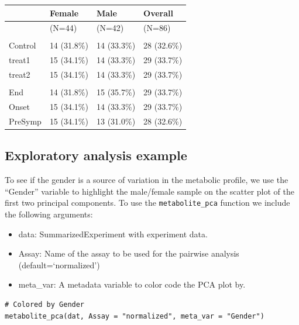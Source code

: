\begin{tabular}[t]{llll}
\toprule
  & Female & Male & Overall\\
\midrule
 & (N=44) & (N=42) & (N=86)\\
\addlinespace[0.3em]
\multicolumn{4}{l}{\textbf{GROUP\_NAME}}\\
\hspace{1em}Control & 14 (31.8\%) & 14 (33.3\%) & 28 (32.6\%)\\
\hspace{1em}treat1 & 15 (34.1\%) & 14 (33.3\%) & 29 (33.7\%)\\
\hspace{1em}treat2 & 15 (34.1\%) & 14 (33.3\%) & 29 (33.7\%)\\
\addlinespace[0.3em]
\multicolumn{4}{l}{\textbf{TIME1}}\\
\hspace{1em}End & 14 (31.8\%) & 15 (35.7\%) & 29 (33.7\%)\\
\hspace{1em}Onset & 15 (34.1\%) & 14 (33.3\%) & 29 (33.7\%)\\
\hspace{1em}PreSymp & 15 (34.1\%) & 13 (31.0\%) & 28 (32.6\%)\\
\bottomrule
\end{tabular}

\subsection{Exploratory analysis example}\label{exploratory-analysis-example}

To see if the gender is a source of variation in the metabolic profile, we use the ``Gender''
variable to highlight the male/female sample on the scatter plot of the first
two principal components. To use the \texttt{metabolite\_pca} function we include the
following arguments:

\begin{itemize}
\item
  data: SummarizedExperiment with experiment data.
\item
  Assay: Name of the assay to be used for the pairwise analysis (default=`normalized')
\item
  meta\_var: A metadata variable to color code the PCA plot by.
\end{itemize}

\begin{verbatim}
# Colored by Gender
metabolite_pca(dat, Assay = "normalized", meta_var = "Gender")
\end{verbatim}

